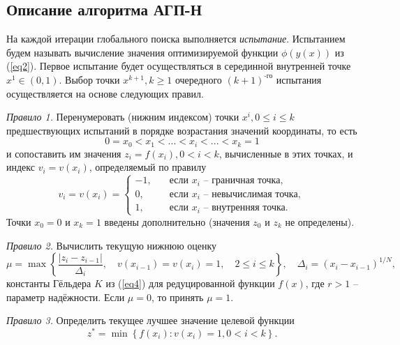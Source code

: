 \documentclass[a4paper,12pt,russian]{article}
\begin{document}
\subsection{Описание алгоритма АГП-Н} \label{algorithm_discr} 

На каждой итерации глобального поиска выполняется \textit{испытание}. Испытанием будем называть вычисление значения оптимизируемой функции $\phi (y(x))$ из (\ref{eq2}). Первое испытание будет осуществляться в серединной внутренней точке $x^1 \in (0,1)$. Выбор точки $x^{k+1}, k \geq 1$ очередного $(k+1)^\text{-го}$ испытания осуществляется на основе следующих правил.

\textit{Правило 1.} Перенумеровать (нижним индексом) точки $x^i, 0 \leq i \leq k$ предшествующих испытаний в порядке возрастания значений координаты, то есть
\begin{equation}\label{eq5} 
0=x_0 < x_1 < ... < x_i < ... < x_{k}=1
\end{equation}
и сопоставить им значения $z_i=f(x_i), 0 < i < k$, вычисленные в этих точках, и индекс $v_i=v(x_i)$, определяемый по правилу
\begin{equation}\label{eq6} 
v_i=v(x_i)=
  \begin{cases}
    -1, & {\quad \text{если } x_i \text{ -- граничная точка}},\\
    0, & {\quad \text{если } x_i \text{ -- невычислимая точка}},\\
    1, & {\quad \text{если } x_i \text{ -- внутренняя точка}}.
  \end{cases}
\end{equation}
Точки $x_0=0$ и $x_{k}=1$ введены дополнительно (значения $z_0$ и $z_{k}$ не определены).

\textit{Правило 2.} Вычислить текущую нижнюю оценку
\begin{equation}\label{eq7} 
\mu = \max\left\{ \frac{|z_i-z_{i-1}|}{\Delta _i},\quad v(x_{i-1})=v(x_i)=1, \quad 2 \leq i \leq k  \right\},\quad \Delta _i= (x_i-x_{i-1})^{1/N},
\end{equation}
константы Гёльдера $K$ из (\ref{eq4}) для редуцированной функции $f(x)$, где $r > 1$ -- параметр надёжности. Если $\mu = 0$, то принять $\mu = 1$.

\textit{Правило 3.} Определить текущее лучшее значение целевой функции
\begin{equation}\label{eq8} 
z^*= \min \left\{ f(x_i): v(x_i)=1, 0 < i < k \right\}.
\end{equation}
\end{document}
